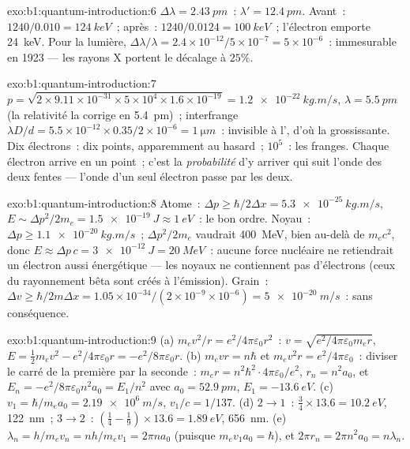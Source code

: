 \begin{solution}{exo:b1:quantum-introduction:6}
$\Delta\lambda = \qty{2.43}{pm}$~: $\lambda' = \qty{12.4}{pm}$. Avant~: $1240/0.010 =
\qty{124}{keV}$~; après~: $1240/0.0124 = \qty{100}{keV}$~; l'électron emporte
\qty{24}{keV}. Pour la lumière, $\Delta\lambda/\lambda = 2.4 \times 10^{-12}/5 \times 10^{-7} = 5 \times
10^{-6}$~: immesurable en 1923 --- les rayons X portent le décalage à $25\%$.
\end{solution}

\begin{solution}{exo:b1:quantum-introduction:7}
$p = \sqrt{2 \times 9.11 \times 10^{-31} \times 5 \times 10^4 \times 1.6 \times 10^{-19}} =
\qty{1.2e-22}{kg.m/s}$, $\lambda = \qty{5.5}{pm}$ (la relativité la corrige en
\qty{5.4}{pm})~; interfrange $\lambda D/d = 5.5 \times 10^{-12} \times 0.35/2 \times 10^{-6}
= \qty{1}{\micro m}$~: invisible à l', d'où la  grossissante. Dix
électrons~: dix points, apparemment au hasard~; $10^5$~: les franges. Chaque
électron arrive en un point~; c'est la \emph{probabilité} d'y arriver qui suit
l'onde des deux fentes --- l'onde d'un seul électron passe par les deux.
\end{solution}

\begin{solution}{exo:b1:quantum-introduction:8}
Atome~: $\Delta p \geq \hbar/2\Delta x = \qty{5.3e-25}{kg.m/s}$, $E \sim \Delta p^2/2m_e =
\qty{1.5e-19}{J} \approx \qty{1}{eV}$~: le bon ordre. Noyau~: $\Delta p \geq
\qty{1.1e-20}{kg.m/s}$~; $\Delta p^2/2m_e$ vaudrait \qty{400}{MeV}, bien au-delà de
$m_ec^2$, donc $E \approx \Delta p\,c = \qty{3e-12}{J} = \qty{20}{MeV}$~: aucune force
nucléaire ne retiendrait un électron aussi énergétique --- les noyaux ne
contiennent pas d'électrons (ceux du rayonnement bêta sont créés à l'émission).
Grain~: $\Delta v \geq
\hbar/2m\Delta x = 1.05 \times 10^{-34}/(2 \times 10^{-9} \times 10^{-6}) = \qty{5e-20}{m/s}$~:
sans conséquence.
\end{solution}

\begin{solution}{exo:b1:quantum-introduction:9}
(a) $m_ev^2/r = e^2/4\pi\varepsilon_0r^2$~: $v = \sqrt{e^2/4\pi\varepsilon_0m_er}$, $E =
\tfrac12m_ev^2 - e^2/4\pi\varepsilon_0r = -e^2/8\pi\varepsilon_0r$. (b) $m_evr = n\hbar$ et
$m_ev^2r = e^2/4\pi\varepsilon_0$~: diviser le carré de la première par la seconde~:
$m_er = n^2\hbar^2 \cdot 4\pi\varepsilon_0/e^2$, $r_n = n^2a_0$, et $E_n = -e^2/8\pi\varepsilon_0n^2a_0
= E_1/n^2$ avec $a_0 = \qty{52.9}{pm}$, $E_1 = \qty{-13.6}{eV}$. (c) $v_1 =
\hbar/m_ea_0 = \qty{2.19e6}{m/s}$, $v_1/c = 1/137$. (d) $2 \to 1$~: $\tfrac34 \times
13.6 = \qty{10.2}{eV}$, \qty{122}{nm}~; $3 \to 2$~: $(\tfrac14 - \tfrac19) \times 13.6 =
\qty{1.89}{eV}$, \qty{656}{nm}. (e) $\lambda_n = h/m_ev_n = nh/m_ev_1 = 2\pi na_0$
(puisque $m_ev_1a_0 = \hbar$), et $2\pi r_n = 2\pi n^2a_0 = n\lambda_n$.
\end{solution}

